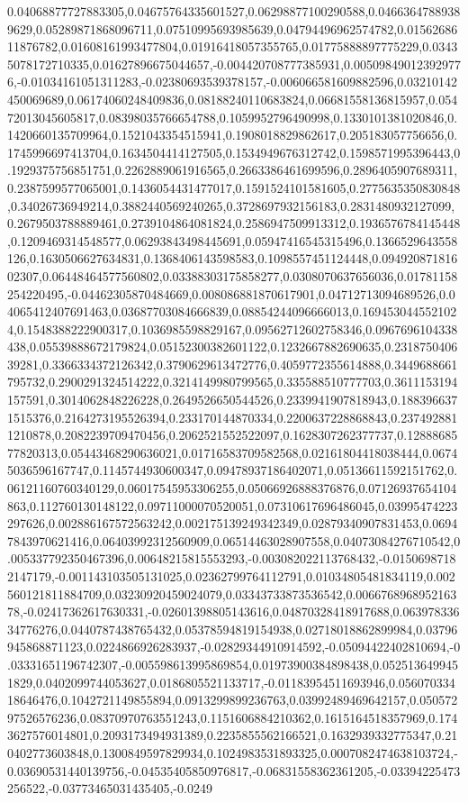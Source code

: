 0.04068877727883305,0.04675764335601527,0.06298877100290588,0.04663647889389629,0.05289871868096711,0.07510995693985639,0.04794496962574782,0.0156268611876782,0.01608161993477804,0.01916418057355765,0.01775888897775229,0.03435078172710335,0.01627896675044657,-0.004420708777385931,0.005098490123929776,-0.01034161051311283,-0.02380693539378157,-0.006066581609882596,0.03210142450069689,0.06174060248409836,0.08188240110683824,0.06681558136815957,0.05472013045605817,0.08398035766654788,0.1059952796490998,0.1330101381020846,0.1420660135709964,0.1521043354515941,0.1908018829862617,0.205183057756656,0.1745996697413704,0.1634504414127505,0.1534949676312742,0.1598571995396443,0.1929375756851751,0.2262889061916565,0.2663386461699596,0.2896405907689311,0.2387599577065001,0.1436054431477017,0.1591524101581605,0.2775635350830848,0.34026736949214,0.3882440569240265,0.3728697932156183,0.2831480932127099,0.2679503788889461,0.2739104864081824,0.2586947509913312,0.1936576784145448,0.1209469314548577,0.06293843498445691,0.05947416545315496,0.1366529643558126,0.1630506627634831,0.1368406143598583,0.1098557451124448,0.09492087181602307,0.06448464577560802,0.03388303175858277,0.0308070637656036,0.01781158254220495,-0.04462305870484669,0.008086881870617901,0.04712713094689526,0.04065412407691463,0.03687703084666839,0.08854244096666013,0.1694530445521024,0.1548388222900317,0.1036985598829167,0.09562712602758346,0.0967696104338438,0.05539888672179824,0.05152300382601122,0.1232667882690635,0.231875040639281,0.3366334372126342,0.3790629613472776,0.4059772355614888,0.3449688661795732,0.2900291324514222,0.3214149980799565,0.335588510777703,0.3611153194157591,0.3014062848226228,0.2649526650544526,0.2339941907818943,0.1883966371515376,0.2164273195526394,0.233170144870334,0.2200637228868843,0.2374928811210878,0.2082239709470456,0.2062521552522097,0.1628307262377737,0.1288868577820313,0.05443468290636021,0.01716583709582568,0.02161804418038444,0.06745036596167747,0.1145744930600347,0.09478937186402071,0.05136611592151762,0.06121160760340129,0.06017545953306255,0.05066926888376876,0.07126937654104863,0.112760130148122,0.09711000070520051,0.07310617696486045,0.03995474223297626,0.002886167572563242,0.002175139249342349,0.02879340907831453,0.06947843970621416,0.06403992312560909,0.06514463028907558,0.04073084276710542,0.005337792350467396,0.00648215815553293,-0.003082022113768432,-0.01506987182147179,-0.001143103505131025,0.02362799764112791,0.01034805481834119,0.002560121811884709,0.03230920459024079,0.03343733873536542,0.006676896895216378,-0.02417362617630331,-0.02601398805143616,0.04870328418917688,0.06397833634776276,0.0440787438765432,0.05378594819154938,0.02718018862899984,0.03796945868871123,0.0224866926283937,-0.02829344910914592,-0.05094422402810694,-0.03331651196742307,-0.005598613995869854,0.01973900384898438,0.0525136499451829,0.0402099744053627,0.0186805521133717,-0.01183954511693946,0.05607033418646476,0.1042721149855894,0.0913299899236763,0.03992489469642157,0.05057297526576236,0.08370970763551243,0.1151606884210362,0.1615164518357969,0.1743627576014801,0.2093173494931389,0.2235855562166521,0.1632939332775347,0.210402773603848,0.1300849597829934,0.1024983531893325,0.0007082474638103724,-0.03690531440139756,-0.04535405850976817,-0.06831558362361205,-0.03394225473256522,-0.03773465031435405,-0.0249